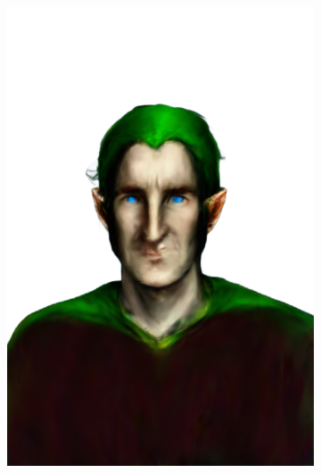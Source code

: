 \begin{figure}
\begin{subfigure}{0.18\linewidth}
        \includegraphics[width=\textwidth]{Figures/failed/igs2gs_1/2_render.png}
	\end{subfigure}
    \begin{subfigure}{0.18\linewidth}

\end{subfigure}
\end{figure}
